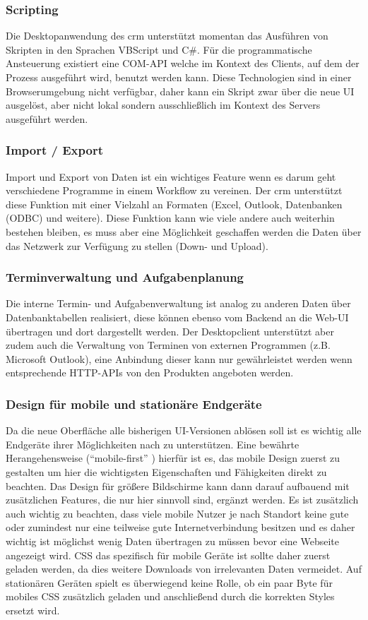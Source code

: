 \subsubsection{Scripting}
Die Desktopanwendung des \gls{crm} unterstützt momentan das Ausführen von Skripten in den Sprachen VBScript und C\#. Für die programmatische Ansteuerung existiert eine \gls{COM}-API welche im Kontext des Clients, auf dem der Prozess ausgeführt wird, benutzt werden kann. Diese Technologien sind in einer Browserumgebung nicht verfügbar, daher kann ein Skript zwar über die neue UI ausgelöst, aber nicht lokal sondern ausschließlich im Kontext des Servers ausgeführt werden.

\subsubsection{Import / Export}
Import und Export von Daten ist ein wichtiges Feature wenn es darum geht verschiedene Programme in einem Workflow zu vereinen. Der \gls{crm} unterstützt diese Funktion mit einer Vielzahl an Formaten (Excel, Outlook, Datenbanken (ODBC) und weitere). Diese Funktion kann wie viele andere auch weiterhin bestehen bleiben, es muss aber eine Möglichkeit geschaffen werden die Daten über das Netzwerk zur Verfügung zu stellen (Down- und Upload).

\subsubsection{Terminverwaltung und Aufgabenplanung}
Die interne Termin- und Aufgabenverwaltung ist analog zu anderen Daten über Datenbanktabellen realisiert, diese können ebenso vom Backend an die Web-UI übertragen und dort dargestellt werden. Der Desktopclient unterstützt aber zudem auch die Verwaltung von Terminen von externen Programmen (z.B. Microsoft Outlook), eine Anbindung dieser kann nur gewährleistet werden wenn entsprechende HTTP-APIs von den Produkten angeboten werden.

\subsubsection{Design für mobile und stationäre Endgeräte}
Da die neue Oberfläche alle bisherigen UI-Versionen ablösen soll ist es wichtig alle Endgeräte ihrer Möglichkeiten nach zu unterstützen. Eine bewährte Herangehensweise (``mobile-first'' ) hierfür ist es, das mobile Design zuerst zu gestalten um hier die wichtigsten Eigenschaften und Fähigkeiten direkt zu beachten. Das Design für größere Bildschirme kann dann darauf aufbauend mit zusätzlichen Features, die nur hier sinnvoll sind, ergänzt werden.
Es ist zusätzlich auch wichtig zu beachten, dass viele mobile Nutzer je nach Standort keine gute oder zumindest nur eine teilweise gute Internetverbindung besitzen und es daher wichtig ist möglichst wenig Daten übertragen zu müssen bevor eine Webseite angezeigt wird. CSS das spezifisch für mobile Geräte ist sollte daher zuerst geladen werden, da dies weitere Downloads von irrelevanten Daten vermeidet. Auf stationären Geräten spielt es überwiegend keine Rolle, ob ein paar Byte für mobiles CSS zusätzlich geladen und anschließend durch die korrekten Styles ersetzt wird.

